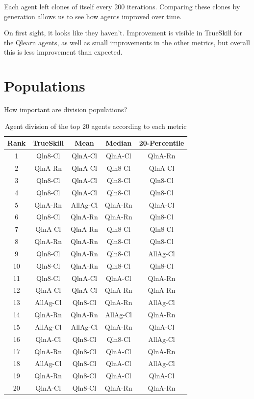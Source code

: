 Each agent left clones of itself every 200 iterations. Comparing these clones by generation allows us to see how agents improved over time.

On first sight, it looks like they haven't. Improvement is visible in TrueSkill for the Qlearn agents, as well as small improvements in the other metrics, but overall this is less improvement than expected.



\section{Populations}

How important are division populations?

\begin{table}[H]
\centering
\begin{tabular}{|| c | c | c | c | c ||} 
 \hline
 Rank & TrueSkill & Mean & Median & 20-Percentile \\ [0.5ex] 
 \hline\hline
   1 &   Qln8-Cl &   QlnA-Cl &   QlnA-Cl &       QlnA-Rn \\
   2 &   QlnA-Rn &   QlnA-Cl &   Qln8-Cl &       QlnA-Cl \\
   3 &   Qln8-Cl &   QlnA-Cl &   Qln8-Cl &       Qln8-Cl \\
   4 &   Qln8-Cl &   QlnA-Cl &   Qln8-Cl &       Qln8-Cl \\
   5 &   QlnA-Rn &  AllAg-Cl &   QlnA-Rn &       QlnA-Cl \\
   6 &   Qln8-Cl &   QlnA-Rn &   QlnA-Rn &       Qln8-Cl \\
   7 &   QlnA-Cl &   QlnA-Rn &   Qln8-Cl &       Qln8-Cl \\
   8 &   QlnA-Rn &   QlnA-Rn &   Qln8-Cl &       Qln8-Cl \\
   9 &   Qln8-Cl &   QlnA-Rn &   Qln8-Cl &      AllAg-Cl \\
  10 &   Qln8-Cl &   QlnA-Rn &   Qln8-Cl &       Qln8-Cl \\
  11 &   Qln8-Cl &   QlnA-Cl &   QlnA-Cl &       QlnA-Rn \\
  12 &   QlnA-Cl &   QlnA-Cl &   QlnA-Rn &       QlnA-Rn \\
  13 &  AllAg-Cl &   Qln8-Cl &   QlnA-Rn &      AllAg-Cl \\
  14 &   QlnA-Rn &   QlnA-Rn &  AllAg-Cl &       QlnA-Rn \\
  15 &  AllAg-Cl &  AllAg-Cl &   QlnA-Rn &       QlnA-Cl \\
  16 &   QlnA-Cl &   Qln8-Cl &   Qln8-Cl &      AllAg-Cl \\
  17 &   QlnA-Rn &   Qln8-Cl &   QlnA-Cl &       QlnA-Rn \\
  18 &  AllAg-Cl &   Qln8-Cl &   QlnA-Cl &      AllAg-Cl \\
  19 &   QlnA-Rn &   Qln8-Cl &   QlnA-Cl &       QlnA-Cl \\
  20 &   QlnA-Cl &   Qln8-Cl &   QlnA-Rn &       QlnA-Rn \\ [1ex] 
 \hline
\end{tabular}
\label{DivisionRankings}
\caption{Agent division of the top 20 agents according to each metric}
\end{table}


